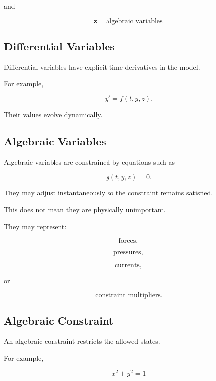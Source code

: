 and

\[
\mathbf{z}
=
\text{algebraic variables}.
\]

\subsection{Differential Variables}
\label{subsec:differential-variables-dae}

Differential variables have explicit time derivatives in the model.

For example,

\[
\boxed{
y'
=
f(t,y,z).
}
\]

Their values evolve dynamically.

\subsection{Algebraic Variables}
\label{subsec:algebraic-variables-dae}

Algebraic variables are constrained by equations such as

\[
\boxed{
g(t,y,z)=0.
}
\]

They may adjust instantaneously so the constraint remains satisfied.

This does not mean they are physically unimportant.

They may represent:

\[
\boxed{
\text{forces},
}
\]

\[
\boxed{
\text{pressures},
}
\]

\[
\boxed{
\text{currents},
}
\]

or

\[
\boxed{
\text{constraint multipliers}.
}
\]

\subsection{Algebraic Constraint}
\label{subsec:dae-algebraic-constraint}

An algebraic constraint restricts the allowed states.

For example,

\[
\boxed{
x^2+y^2=1
}
\]

